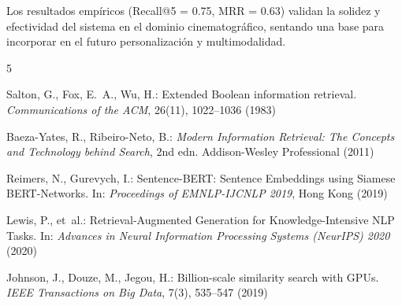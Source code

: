 \documentclass[10pt,a4paper]{llncs}
\begin{document}
Los resultados empíricos (Recall@5 = 0.75, MRR = 0.63) validan la solidez y efectividad del sistema en el dominio cinematográfico, sentando una base para incorporar en el futuro personalización y multimodalidad.

\begin{thebibliography}{5}

Salton, G., Fox, E.~A., Wu, H.: Extended Boolean information retrieval.
\newblock \textit{Communications of the ACM}, 26(11), 1022--1036 (1983)

Baeza-Yates, R., Ribeiro-Neto, B.: \textit{Modern Information Retrieval: The
  Concepts and Technology behind Search}, 2nd edn. Addison-Wesley Professional
(2011)

Reimers, N., Gurevych, I.: Sentence-BERT: Sentence Embeddings using Siamese
BERT-Networks.
\newblock In: \textit{Proceedings of EMNLP-IJCNLP 2019}, Hong Kong (2019)

Lewis, P., et~al.: Retrieval-Augmented Generation for Knowledge-Intensive NLP
Tasks.
\newblock In: \textit{Advances in Neural Information Processing Systems
  (NeurIPS) 2020} (2020)

Johnson, J., Douze, M., Jegou, H.: Billion-scale similarity search with GPUs.
\newblock \textit{IEEE Transactions on Big Data}, 7(3), 535--547 (2019)

\end{thebibliography}
\end{document}
